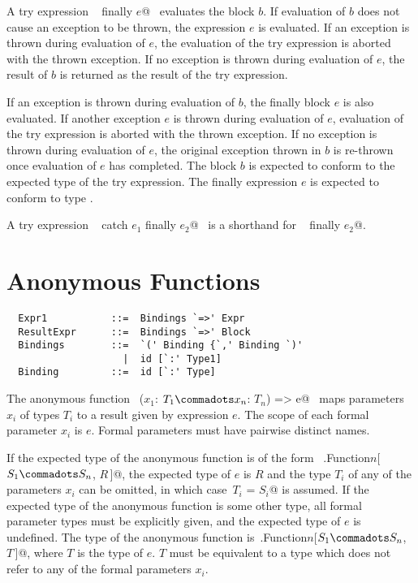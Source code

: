 A try expression ~ finally $e$@~ evaluates the block
$b$.  If evaluation of $b$ does not cause an exception to be
thrown, the expression $e$ is evaluated. If an exception is thrown
during evaluation of $e$, the evaluation of the try expression is
aborted with the thrown exception. If no exception is thrown during
evaluation of $e$, the result of $b$ is returned as the
result of the try expression. 

If an exception is thrown during
evaluation of $b$, the finally block
$e$ is also evaluated. If another exception $e$ is thrown
during evaluation of $e$, evaluation of the try expression is
aborted with the thrown exception. If no exception is thrown during
evaluation of $e$, the original exception thrown in $b$ is
re-thrown once evaluation of $e$ has completed.  The block
$b$ is expected to conform to the expected type of the try
expression. The finally expression $e$ is expected to conform to
type .

A try expression ~ catch $e_1$ finally $e_2$@~ is a shorthand
for  ~ finally $e_2$@.




\section{Anonymous Functions}
\label{sec:closures}

\syntax\begin{lstlisting}
  Expr1           ::=  Bindings `=>' Expr
  ResultExpr      ::=  Bindings `=>' Block
  Bindings        ::=  `(' Binding {`,' Binding `)'
                    |  id [`:' Type1]
  Binding         ::=  id [`:' Type]
\end{lstlisting}

The anonymous function ~\lstinline@($x_1$: $T_1 \commadots x_n$: $T_n$) => e@~ 
maps parameters $x_i$ of types $T_i$ to a result given
by expression $e$. The scope of each formal parameter
$x_i$ is $e$. Formal parameters must have pairwise distinct names.

If the expected type of the anonymous function is of the form
~\lstinline@scala.Function$n$[$S_1 \commadots S_n$, $R\,$]@, the
expected type of $e$ is $R$ and the type $T_i$ of any of the
parameters $x_i$ can be omitted, in which
case~\lstinline@$T_i$ = $S_i$@ is assumed.
If the expected type of the anonymous function is
some other type, all formal parameter types must be explicitly given,
and the expected type of $e$ is undefined. The type of the anonymous
function
is~\lstinline@scala.Function$n$[$S_1 \commadots S_n$, $T\,$]@,
where $T$ is the type of $e$. $T$ must be equivalent to a
type which does not refer to any of the formal parameters $x_i$.

